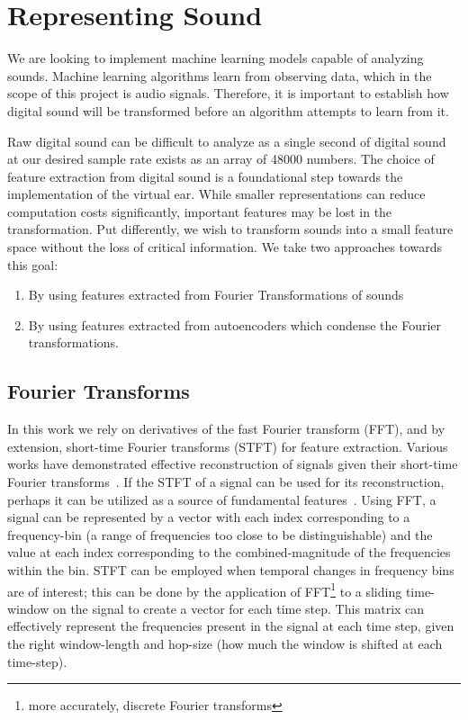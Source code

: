 \documentclass[\main/thesis.tex]{subfiles}
\begin{document}
\section{Representing Sound}
\label{chap:represent_sound}
We are looking to implement machine learning models capable of analyzing sounds. Machine learning algorithms learn from observing data, which in the scope of this project is audio signals. Therefore, it is important to establish how digital sound will be transformed before an algorithm attempts to learn from it. 

Raw digital sound can be difficult to analyze as a single second of digital sound at our desired sample rate exists as an array of 48000 numbers. The choice of feature extraction from digital sound is a foundational step towards the implementation of the virtual ear. While smaller representations can reduce computation costs significantly, important features may be lost in the transformation. Put differently, we wish to transform sounds into a small feature space without the loss of critical information. We take two approaches towards this goal: \begin{enumerate}
    \item By using features extracted from Fourier Transformations of sounds \item By using features extracted from autoencoders which condense the Fourier transformations. 
\end{enumerate}
\subsection{Fourier Transforms}
\label{sec:fourier_transforms}
In this work we rely on derivatives of the fast Fourier transform (FFT), and by extension, short-time Fourier transforms (STFT) for feature extraction. Various works have demonstrated effective reconstruction of signals given their short-time Fourier transforms~\cite{nawab1983signal,griffin1984signal}. If the STFT of a signal can be used for its reconstruction, perhaps it can be utilized as a source of fundamental features~\cite{lee2009unsupervised,huzaifah2017comparison}. Using FFT, a signal can be represented by a vector with each index corresponding to a frequency-bin (a range of frequencies too close to be distinguishable) and the value at each index corresponding to the combined-magnitude of the frequencies within the bin. STFT can be employed when temporal changes in frequency bins are of interest; this can be done by the application of FFT\footnote{more accurately, discrete Fourier transforms} to a sliding time-window on the signal to create a vector for each time step. This matrix can effectively represent the frequencies present in the signal at each time step, given the right window-length and hop-size (how much the window is shifted at each time-step). 
\end{document}
